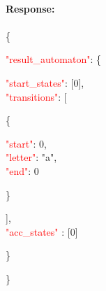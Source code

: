 \ \\
\textbf{Response:}\\
\ \\
\{
 \begin{adjustwidth}{7.5 mm}{0 cm}
    \textcolor{red}{"result\_automaton"}: \{
        \begin{adjustwidth}{7.5 mm}{0 cm}
            \textcolor{red}{"start\_states"}: [0],\\
            \textcolor{red}{"transitions"}: [
            \begin{adjustwidth}{7.5 mm}{0 cm}
            \{
               \begin{adjustwidth}{7.5 mm}{0 cm}
                    \textcolor{red}{"start"}: 0,\\
                    \textcolor{red}{"letter"}: "a",\\
                    \textcolor{red}{"end"}: 0
               \end{adjustwidth}
            \}
            \end{adjustwidth}
            ],\\
        \textcolor{red}{"acc\_states" }: [0]
    \end{adjustwidth}
    \}
\end{adjustwidth}
\}




